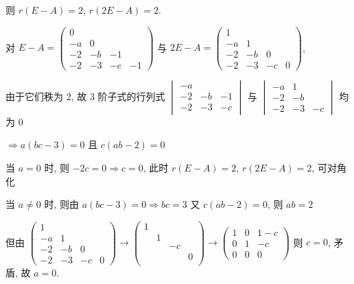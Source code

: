          则 \( r(E - A) = 2 \), \( r(2E - A) = 2 \).

         对 \( E - A = \begin{pmatrix}
             0  &    &    &    \\
             -a & 0  &    &    \\
             -2 & -b & -1 &    \\
             -2 & -3 & -c & -1
         \end{pmatrix} \) 与 \( 2E - A = \begin{pmatrix}
             1  &    &    &   \\
             -a & 1  &    &   \\
             -2 & -b & 0  &   \\
             -2 & -3 & -c & 0
         \end{pmatrix} \),

         由于它们秩为 2, 故 3 阶子式的行列式 \( \begin{vmatrix}
             -a &    &    \\
             -2 & -b & -1 \\
             -2 & -3 & -c
         \end{vmatrix} \) 与 \( \begin{vmatrix}
             -a & 1  &     \\
             -2 & -b &     \\
             -2 & -3 & - c
         \end{vmatrix} \) 均为 0

         \( \Rightarrow a(bc - 3) = 0 \) 且 \( c(ab - 2) = 0 \)

         当 \( a = 0 \) 时, 则 \( -2c = 0 \Rightarrow c = 0 \), 此时 \( r(E - A) = 2 \), \( r(2E - A) = 2 \), 可对角化

         当 \( a \neq 0 \) 时, 则由 \( a(bc - 3) = 0 \Rightarrow bc = 3 \) 又 \( c(ab - 2) = 0 \), 则 \( ab = 2 \)

         但由 \( \begin{pmatrix}
             1  &    &    &   \\
             -a & 1  &    &   \\
             -2 & -b & 0  &   \\
             -2 & -3 & -c & 0
         \end{pmatrix} \rightarrow
         \begin{pmatrix}
             1 &   &    &   \\
               & 1 &    &   \\
               &   & -c &   \\
               &   &    & 0 \\
         \end{pmatrix}
         \rightarrow
         \begin{pmatrix}
             1 & 0 & 1 - c \\
             0 & 1 & -c    \\
             0 & 0 & 0
         \end{pmatrix} \) 则 \( c = 0 \), 矛盾, 故 \( a = 0 \).

